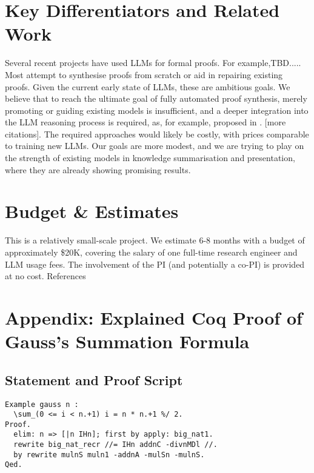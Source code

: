 \documentclass[letterpaper]{article}
\begin{document}
\section*{Key Differentiators and Related Work}

Several recent projects have used LLMs for formal proofs. For
example,TBD.....  Most attempt to synthesise proofs from scratch or
aid in repairing existing proofs. Given the current early state of
LLMs, these are ambitious goals. We believe that to reach the ultimate
goal of fully automated proof synthesis, merely promoting or guiding
existing models is insufficient, and a deeper integration into the LLM
reasoning process is required, as, for example, proposed in
\cite{park2024grammaraligneddecoding}. [more citations]. The required
approaches would likely be costly, with prices comparable to training
new LLMs. Our goals are more modest, and we are trying to play on the
strength of existing models in knowledge summarisation and
presentation, where they are already showing promising results.

\section*{Budget \& Estimates}

This is a relatively small-scale project. We estimate 6-8 months with
a budget of approximately \$20K, covering the salary of one full-time
research engineer and LLM usage fees. The involvement of the PI (and
potentially a co-PI) is provided at no cost.  References

\pagebreak
\appendix

\section{Appendix: Explained Coq Proof of Gauss's Summation Formula}
\label{sec:explained}
\subsection*{Statement and Proof Script}

\begin{lstlisting}
Example gauss n :
  \sum_(0 <= i < n.+1) i = n * n.+1 %/ 2.
Proof.
  elim: n => [|n IHn]; first by apply: big_nat1.
  rewrite big_nat_recr //= IHn addnC -divnMDl //.
  by rewrite mulnS muln1 -addnA -mulSn -mulnS.
Qed.
\end{lstlisting}
\end{document}
